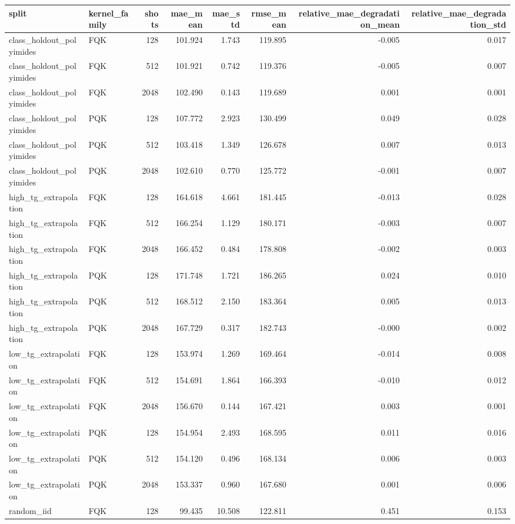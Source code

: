 \begin{tabular}{llrrrrrr}
\toprule
split & kernel\_family & shots & mae\_mean & mae\_std & rmse\_mean & relative\_mae\_degradation\_mean & relative\_mae\_degradation\_std \\
\midrule
class\_holdout\_polyimides & FQK & 128 & 101.924 & 1.743 & 119.895 & -0.005 & 0.017 \\
class\_holdout\_polyimides & FQK & 512 & 101.921 & 0.742 & 119.376 & -0.005 & 0.007 \\
class\_holdout\_polyimides & FQK & 2048 & 102.490 & 0.143 & 119.689 & 0.001 & 0.001 \\
class\_holdout\_polyimides & PQK & 128 & 107.772 & 2.923 & 130.499 & 0.049 & 0.028 \\
class\_holdout\_polyimides & PQK & 512 & 103.418 & 1.349 & 126.678 & 0.007 & 0.013 \\
class\_holdout\_polyimides & PQK & 2048 & 102.610 & 0.770 & 125.772 & -0.001 & 0.007 \\
high\_tg\_extrapolation & FQK & 128 & 164.618 & 4.661 & 181.445 & -0.013 & 0.028 \\
high\_tg\_extrapolation & FQK & 512 & 166.254 & 1.129 & 180.171 & -0.003 & 0.007 \\
high\_tg\_extrapolation & FQK & 2048 & 166.452 & 0.484 & 178.808 & -0.002 & 0.003 \\
high\_tg\_extrapolation & PQK & 128 & 171.748 & 1.721 & 186.265 & 0.024 & 0.010 \\
high\_tg\_extrapolation & PQK & 512 & 168.512 & 2.150 & 183.364 & 0.005 & 0.013 \\
high\_tg\_extrapolation & PQK & 2048 & 167.729 & 0.317 & 182.743 & -0.000 & 0.002 \\
low\_tg\_extrapolation & FQK & 128 & 153.974 & 1.269 & 169.464 & -0.014 & 0.008 \\
low\_tg\_extrapolation & FQK & 512 & 154.691 & 1.864 & 166.393 & -0.010 & 0.012 \\
low\_tg\_extrapolation & FQK & 2048 & 156.670 & 0.144 & 167.421 & 0.003 & 0.001 \\
low\_tg\_extrapolation & PQK & 128 & 154.954 & 2.493 & 168.595 & 0.011 & 0.016 \\
low\_tg\_extrapolation & PQK & 512 & 154.120 & 0.496 & 168.134 & 0.006 & 0.003 \\
low\_tg\_extrapolation & PQK & 2048 & 153.337 & 0.960 & 167.680 & 0.001 & 0.006 \\
random\_iid & FQK & 128 & 99.435 & 10.508 & 122.811 & 0.451 & 0.153 \\

\end{tabular}
